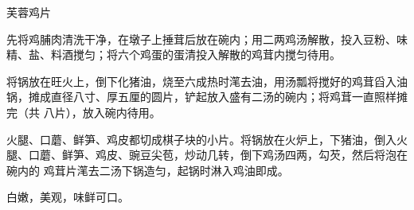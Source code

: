 %
%
%
%
%
%
%
\begin{recipe}{芙蓉鸡片}

\ingredients


\preparation

\step 先将鸡脯肉清洗干净，在墩子上捶茸后放在碗内；用二两鸡汤解散，投入豆粉、味
精、盐、料酒搅匀；将六个鸡蛋的蛋清投入解散的鸡茸内搅匀待用。

\step 将锅放在旺火上，倒下化猪油，烧至六成热时滗去油，用汤瓢将搅好的鸡茸舀入油
锅，摊成直径八寸、厚五厘的圆片，铲起放入盛有二汤的碗内；将鸡茸一直照样摊完（共
八片），放入碗内待用。

\step 火腿、口蘑、鲜笋、鸡皮都切成棋子块的小片。将锅放在火炉上，下猪油，倒入火
腿、口蘑、鲜笋、鸡皮、豌豆尖苞，炒动几转，倒下鸡汤四两，勾芡，然后将泡在碗内的
鸡茸片滗去二汤下锅造匀，起锅时淋入鸡油即成。

\features

白嫩，美观，味鲜可口。

\end{recipe}

